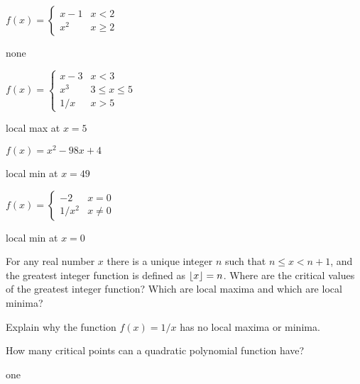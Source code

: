 \begin{exercises}
\begin{exercise} $f(x) = \begin{cases} x-1 & x < 2  \\
x^2 & x\geq 2 \end{cases}$
\begin{answer} none
\end{answer}\end{exercise}

 \begin{exercise} $f(x) = \begin{cases} x-3 & x < 3  \\
x^3  & 3\leq x \leq 5 \\
1/x  & x>5 \end{cases}$
\begin{answer} local max at $x=5$
\end{answer}\end{exercise}

\begin{exercise} $f(x) = x^2 - 98x + 4$
\begin{answer} local min at $x=49$
\end{answer}\end{exercise}

\begin{exercise} $f(x) =\begin{cases} -2 & x = 0  \\
1/x^2 & x \neq 0 \end{cases}$
\begin{answer} local min at $x=0$
\end{answer}\end{exercise}

\endtwocol

\begin{exercise}  For any real number $x$ there is a unique
  integer $n$ such that $n \leq x < n +1$, and the greatest
  integer function is defined as $\displaystyle\lfloor
  x\rfloor = n$. Where
  are the critical values of the greatest integer function?  Which are
  local maxima and which are local minima?
\end{exercise}

\begin{exercise} Explain why the function $f(x) =1/x$ has no local
maxima or minima.
\end{exercise}

\begin{exercise} How many critical points can a quadratic polynomial function have?
\begin{answer} one
\end{answer}\end{exercise}


\end{exercises}
